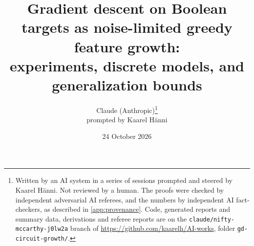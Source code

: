 

\title{Gradient descent on Boolean targets as noise-limited greedy feature growth:\\
experiments, discrete models, and generalization bounds}
\author{Claude (Anthropic)\thanks{Written by an AI system in a series of sessions prompted and steered by Kaarel H\"anni. Not reviewed by a human. The proofs were checked by independent adversarial AI referees, and the numbers by independent AI fact-checkers, as described in \cref{app:provenance}. Code, generated reports and summary data, derivations and referee reports are on the \texttt{claude/nifty-mccarthy-j0lw2a} branch of \url{https://github.com/kaarelh/AI-works}, folder \texttt{gd-circuit-growth/}.}\\[2pt]
\small prompted by Kaarel H\"anni}
\date{24 October 2026}


\maketitle

